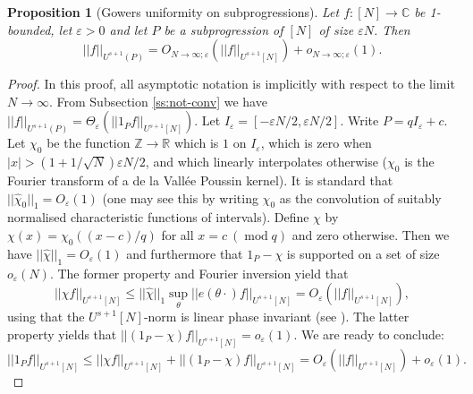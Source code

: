 \documentclass[10pt]{article}
\def\eps{\varepsilon}
\def\Z{\mathbb{Z}}
\def\R{\mathbb{R}}
\def\C{\mathbb{C}}
\DeclareMathOperator\mo{mod}
\newtheorem{prop}[firstthm]{Proposition}
\begin{document}
\begin{prop}[Gowers uniformity on subprogressions]\label{p:gowersUniformSubprog}
Let $f:[N]\to \C$ be 1-bounded, let $\eps >0$ and let $P$ be a subprogression of $[N]$ of size $\eps N$. Then \[||f||_{U^{s+1}(P)} = O_{N \to \infty;\eps}(||f||_{U^{s+1}[N]}) + o_{N \to \infty;\eps}(1).\]
\end{prop}
\begin{proof}
In this proof, all asymptotic notation is implicitly with respect to the limit $N \to \infty$. From Subsection \ref{ss:not-conv} we have $||f||_{U^{s+1}(P)} = \Theta_\eps(||1_Pf||_{U^{s+1}[N]})$. Let $I_\eps = [-\eps N/2,\eps N/2]$. Write $P=qI_\eps+c$. Let $\chi_0$ be the function $\Z \to \R$ which is $1$ on $I_\eps$, which is zero when $|x| > (1+1/\sqrt {N})\eps N/2$, and which linearly interpolates otherwise ($\chi_0$ is the Fourier transform of a de la Vall\'ee Poussin kernel). It is standard that $||\hat \chi_0||_1 = O_\eps(1)$ (one may see this by writing $\chi_0$ as the convolution of suitably normalised characteristic functions of intervals).   
Define $\chi$ by $\chi(x) = \chi_0((x-c)/q)$ for all $x = c\ (\mo q)$ and zero otherwise. Then we have $||\hat \chi||_1 = O_\eps(1)$ and furthermore that $1_P-\chi$ is supported on a set of size $o_\eps(N)$. The former property and Fourier inversion yield that 
\[ ||\chi f||_{U^{s+1}[N]} \leq ||\hat \chi||_1\sup_\theta||e(\theta \cdot)f||_{U^{s+1}[N]} = O_\eps(||f||_{U^{s+1}[N]}),\]
using that the $U^{s+1}[N]$-norm is linear phase invariant (see \cite[Exercise 1.3.21]{T12}). The latter property yields that $||(1_P-\chi)f||_{U^{s+1}[N]} = o_\eps(1)$. We are ready to conclude: 
\[ ||1_Pf||_{U^{s+1}[N]} \leq ||\chi f||_{U^{s+1}[N]} + ||(1_P-\chi)f||_{U^{s+1}[N]} = O_{\eps}(||f||_{U^{s+1}[N]}) + o_{\eps}(1).\]
\end{proof}
\end{document}
